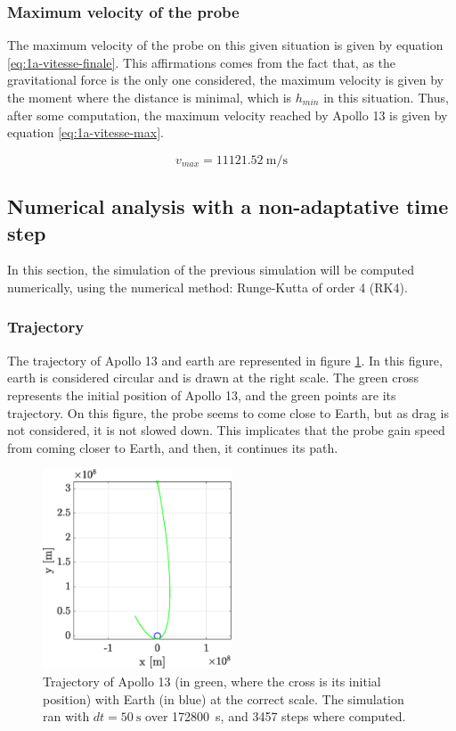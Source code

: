 \documentclass[a4paper,12pt,twoside]{article}
\begin{document}
\subsubsection{Maximum velocity of the probe}
The maximum velocity of the probe on this given situation is given by equation \eqref{eq:1a-vitesse-finale}.
This affirmations comes from the fact that, as the gravitational force is the only one considered, the maximum velocity is given by the moment where the distance is minimal, which is $h_{min}$ in this situation.
Thus, after some computation, the maximum velocity reached by Apollo 13 is given by equation \eqref{eq:1a-vitesse-max}.

\begin{equation}
  v_{max} = \SI{11121.52}{\meter\per\second} %
  \label{eq:1a-vitesse-max}
\end{equation}




\subsection{Numerical analysis with a non-adaptative time step}
In this section, the simulation of the previous simulation will be computed numerically, using the numerical method: Runge-Kutta of order 4 (RK4).

\subsubsection{Trajectory}\label{sec:1b_traj}
The trajectory of Apollo 13 and earth are represented in figure \ref{fig:1b_traj}.
In this figure, earth is considered circular and is drawn at the right scale.
The green cross represents the initial position of Apollo 13, and the green points are its trajectory.
On this figure, the probe seems to come close to Earth, but as drag is not considered, it is not slowed down.
This implicates that the probe gain speed from coming closer to Earth, and then, it continues its path.

\begin{figure}[h]
  \centering
  \includegraphics[width=0.5\textwidth]{graphs/ex1b_traj.eps}
  \caption{Trajectory of Apollo 13 (in green, where the cross is its initial position) with Earth (in blue) at the correct scale. The simulation ran with $dt=\SI{50}{\s}$ over \SI{172800}{\s}, and \num{3457} steps where computed.}
  \label{fig:1b_traj}
\end{figure}
\end{document}
